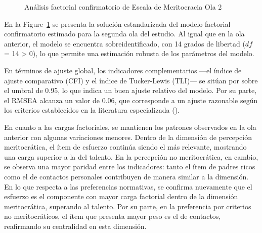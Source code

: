 \documentclass[
  12pt,
]{article}
\begin{document}
\begin{figure}

\caption{\label{fig-cfa2}Análisis factorial confirmatorio de Escala de
Meritocracia Ola 2}


\end{figure}%

En la Figure~\ref{fig-cfa2} se presenta la solución estandarizada del
modelo factorial confirmatorio estimado para la segunda ola del estudio.
Al igual que en la ola anterior, el modelo se encuentra
sobreidentificado, con 14 grados de libertad (\(df\) = 14 \textgreater{}
0), lo que permite una estimación robusta de los parámetros del modelo.

En términos de ajuste global, los indicadores complementarios ---el
índice de ajuste comparativo (CFI) y el índice de Tucker-Lewis (TLI)---
se sitúan por sobre el umbral de 0.95, lo que indica un buen ajuste
relativo del modelo. Por su parte, el RMSEA alcanza un valor de 0.06,
que corresponde a un ajuste razonable según los criterios establecidos
en la literatura especializada
().

En cuanto a las cargas factoriales, se mantienen los patrones observados
en la ola anterior con algunas variaciones menores. Dentro de la
dimensión de percepción meritocrática, el ítem de esfuerzo continúa
siendo el más relevante, mostrando una carga superior a la del talento.
En la percepción no meritocrática, en cambio, se observa una mayor
paridad entre los indicadores: tanto el ítem de padres ricos como el de
contactos personales contribuyen de manera similar a la dimensión. En lo
que respecta a las preferencias normativas, se confirma nuevamente que
el esfuerzo es el componente con mayor carga factorial dentro de la
dimensión meritocrática, superando al talento. Por su parte, en la
preferencia por criterios no meritocráticos, el ítem que presenta mayor
peso es el de contactos, reafirmando su centralidad en esta dimensión.
\end{document}
